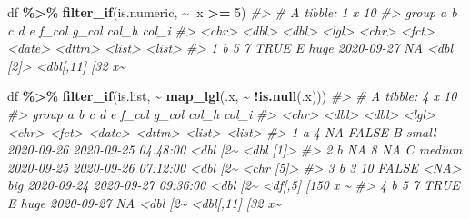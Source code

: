 \documentclass[
]{report}
\newenvironment{Shaded}{\begin{snugshade}}{\end{snugshade}}
\newcommand{\CommentTok}[1]{\textcolor[rgb]{0.56,0.35,0.01}{\textit{#1}}}
\newcommand{\DecValTok}[1]{\textcolor[rgb]{0.00,0.00,0.81}{#1}}
\newcommand{\KeywordTok}[1]{\textcolor[rgb]{0.13,0.29,0.53}{\textbf{#1}}}
\newcommand{\NormalTok}[1]{#1}
\newcommand{\OperatorTok}[1]{\textcolor[rgb]{0.81,0.36,0.00}{\textbf{#1}}}
\newcommand{\StringTok}[1]{\textcolor[rgb]{0.31,0.60,0.02}{#1}}
\begin{document}
\begin{Shaded}
\begin{Highlighting}[]
\NormalTok{df }\OperatorTok{\%\textgreater{}\%}
\StringTok{  }\KeywordTok{filter\_if}\NormalTok{(is.numeric, }\OperatorTok{\textasciitilde{}}\StringTok{ }\NormalTok{.x }\OperatorTok{\textgreater{}=}\StringTok{ }\DecValTok{5}\NormalTok{)}
\CommentTok{\#\textgreater{} \# A tibble: 1 x 10}
\CommentTok{\#\textgreater{}   group     a     b c     d     e     f\_col      g\_col               col\_h     col\_i           }
\CommentTok{\#\textgreater{}   \textless{}chr\textgreater{} \textless{}dbl\textgreater{} \textless{}dbl\textgreater{} \textless{}lgl\textgreater{} \textless{}chr\textgreater{} \textless{}fct\textgreater{} \textless{}date\textgreater{}     \textless{}dttm\textgreater{}              \textless{}list\textgreater{}    \textless{}list\textgreater{}          }
\CommentTok{\#\textgreater{} 1 b         5     7 TRUE  E     huge  2020{-}09{-}27 NA                  \textless{}dbl [2]\textgreater{} \textless{}dbl[,11] [32 x\textasciitilde{}}
\end{Highlighting}
\end{Shaded}

\begin{Shaded}
\begin{Highlighting}[]
\NormalTok{df }\OperatorTok{\%\textgreater{}\%}
\StringTok{  }\KeywordTok{filter\_if}\NormalTok{(is.list, }\OperatorTok{\textasciitilde{}}\StringTok{ }\KeywordTok{map\_lgl}\NormalTok{(.x, }\OperatorTok{\textasciitilde{}}\StringTok{ }\OperatorTok{!}\KeywordTok{is.null}\NormalTok{(.x)))}
\CommentTok{\#\textgreater{} \# A tibble: 4 x 10}
\CommentTok{\#\textgreater{}   group     a     b c     d     e      f\_col      g\_col               col\_h    col\_i           }
\CommentTok{\#\textgreater{}   \textless{}chr\textgreater{} \textless{}dbl\textgreater{} \textless{}dbl\textgreater{} \textless{}lgl\textgreater{} \textless{}chr\textgreater{} \textless{}fct\textgreater{}  \textless{}date\textgreater{}     \textless{}dttm\textgreater{}              \textless{}list\textgreater{}   \textless{}list\textgreater{}          }
\CommentTok{\#\textgreater{} 1 a         4    NA FALSE B     small  2020{-}09{-}26 2020{-}09{-}25 04:48:00 \textless{}dbl [2\textasciitilde{} \textless{}dbl [1]\textgreater{}       }
\CommentTok{\#\textgreater{} 2 b        NA     8 NA    C     medium 2020{-}09{-}25 2020{-}09{-}26 07:12:00 \textless{}dbl [2\textasciitilde{} \textless{}chr [5]\textgreater{}       }
\CommentTok{\#\textgreater{} 3 b         3    10 FALSE \textless{}NA\textgreater{}  big    2020{-}09{-}24 2020{-}09{-}27 09:36:00 \textless{}dbl [2\textasciitilde{} \textless{}df[,5] [150 x \textasciitilde{}}
\CommentTok{\#\textgreater{} 4 b         5     7 TRUE  E     huge   2020{-}09{-}27 NA                  \textless{}dbl [2\textasciitilde{} \textless{}dbl[,11] [32 x\textasciitilde{}}
\end{Highlighting}
\end{Shaded}
\end{document}
